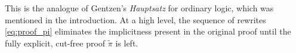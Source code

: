 \documentclass[english,letter paper,12pt,reqno]{article}
\theoremstyle{example}
\numberwithin{equation}{section}
\begin{document}
This is the analogue of Gentzen's \emph{Hauptsatz} for ordinary logic, which was mentioned in the introduction. At a high level, the sequence of rewrites \eqref{eq:proof_pi} eliminates the implicitness present in the original proof until the fully explicit, cut-free proof $\widetilde{\pi}$ is left. %
\end{document}
